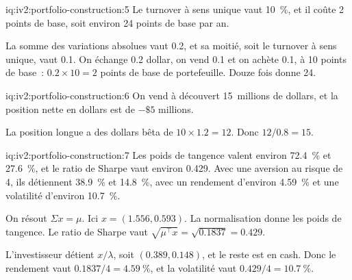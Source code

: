 \begin{solution}{iq:iv2:portfolio-construction:5}
Le turnover à sens unique vaut 10~\%, et il coûte 2 points de base, soit environ 24 points de base par an.

La somme des variations absolues vaut 0.2, et sa moitié, soit le turnover à sens unique, vaut 0.1. On échange 0.2 dollar, on vend 0.1 et on achète 0.1, à 10 points de base~: $0.2 \times 10 = 2$ points de base de portefeuille. Douze fois donne 24.

\end{solution}

\begin{solution}{iq:iv2:portfolio-construction:6}
On vend à découvert 15~millions de dollars, et la position nette en dollars est de $-\$5$ millions.

La position longue a des dollars bêta de $10 \times 1.2 = 12$. Donc $12/0.8 = 15$.

\end{solution}

\begin{solution}{iq:iv2:portfolio-construction:7}
Les poids de tangence valent environ 72.4~\% et 27.6~\%, et le ratio de Sharpe vaut environ 0.429. Avec une aversion au risque de 4, ils détiennent 38.9~\% et 14.8~\%, avec un rendement d'environ 4.59~\% et une volatilité d'environ 10.7~\%.

On résout $\Sigma x = \mu$. Ici $x = (1.556, 0.593)$. La normalisation donne les poids de tangence. Le ratio de Sharpe vaut $\sqrt{\mu^\top x} = \sqrt{0.1837} = 0.429$.

L'investisseur détient $x/\lambda$, soit $(0.389, 0.148)$, et le reste est en cash. Donc le rendement vaut $0.1837/4 = 4.59~\%$, et la volatilité vaut $0.429/4 = 10.7~\%$.

\end{solution}

